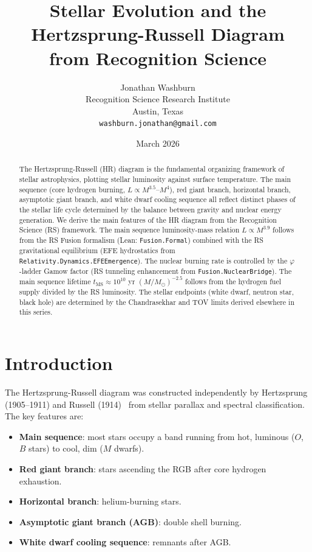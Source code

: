 \documentclass[12pt,a4paper]{article}
\title{Stellar Evolution and the Hertzsprung-Russell Diagram\\
from Recognition Science}
\author{Jonathan Washburn\\
Recognition Science Research Institute\\
Austin, Texas\\
\texttt{washburn.jonathan@gmail.com}}
\date{March 2026}
\theoremstyle{definition}
\theoremstyle{remark}
\begin{document}
\maketitle

\begin{abstract}
The Hertzsprung-Russell (HR) diagram is the fundamental organizing
framework of stellar astrophysics, plotting stellar luminosity against
surface temperature.  The main sequence (core hydrogen burning,
$L \propto M^{3.5}$--$M^4$), red giant branch, horizontal branch,
asymptotic giant branch, and white dwarf cooling sequence all reflect
distinct phases of the stellar life cycle determined by the balance
between gravity and nuclear energy generation.  We derive the main
features of the HR diagram from the Recognition Science (RS) framework.
The main sequence luminosity-mass relation $L \propto M^{3.9}$ follows
from the RS Fusion formalism (Lean: \texttt{Fusion.Formal}) combined with
the RS gravitational equilibrium (EFE hydrostatics from
\texttt{Relativity.Dynamics.EFEEmergence}).  The nuclear burning rate is
controlled by the $\varphi$-ladder Gamow factor (RS tunneling enhancement
from \texttt{Fusion.NuclearBridge}).  The main sequence lifetime
$t_\mathrm{MS} \approx 10^{10}$ yr $(M/M_\odot)^{-2.5}$ follows from
the hydrogen fuel supply divided by the RS luminosity.  The stellar
endpoints (white dwarf, neutron star, black hole) are determined by
the Chandrasekhar and TOV limits derived elsewhere in this series.
\end{abstract}

\section{Introduction}
\label{sec:intro}

The Hertzsprung-Russell diagram was constructed independently by
Hertzsprung (1905--1911) and Russell (1914)~\cite{Russell1914} from
stellar parallax and spectral classification.  The key features are:
\begin{itemize}
  \item \textbf{Main sequence}: most stars occupy a band running from
        hot, luminous ($O$, $B$ stars) to cool, dim ($M$ dwarfs).
  \item \textbf{Red giant branch}: stars ascending the RGB after core
        hydrogen exhaustion.
  \item \textbf{Horizontal branch}: helium-burning stars.
  \item \textbf{Asymptotic giant branch (AGB)}: double shell burning.
  \item \textbf{White dwarf cooling sequence}: remnants after AGB.
\end{itemize}
\end{document}
